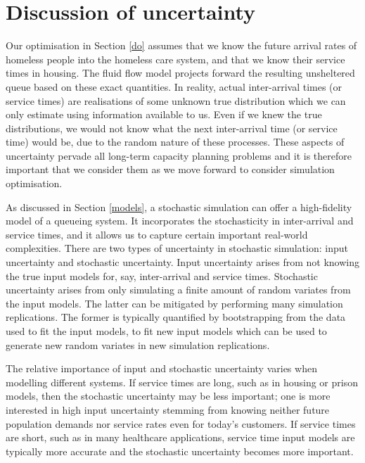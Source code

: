 \documentclass[12pt,a4paper]{article}
\begin{document}
\newpage

\section{Discussion of uncertainty} \label{uncert}

Our optimisation in Section \ref{do} assumes that we know the future arrival rates of homeless people into the homeless care system, and that we know their service times in housing. The fluid flow model projects forward the resulting unsheltered queue based on these exact quantities. In reality, actual inter-arrival times (or service times) are realisations of some unknown true distribution which we can only estimate using information available to us. Even if we knew the true distributions, we would not know what the next inter-arrival time (or service time) would be, due to the random nature of these processes. These aspects of uncertainty pervade all long-term capacity planning problems and it is therefore important that we consider them as we move forward to consider simulation optimisation.

As discussed in Section \ref{models}, a stochastic simulation can offer a high-fidelity model of a queueing system. It incorporates the stochasticity in inter-arrival and service times, and it allows us to capture certain important real-world complexities. There are two types of uncertainty in stochastic simulation: input uncertainty and stochastic uncertainty. Input uncertainty arises from not knowing the true input models for, say, inter-arrival and service times. Stochastic uncertainty arises from only simulating a finite amount of random variates from the input models. The latter can be mitigated by performing many simulation replications. The former is typically quantified by bootstrapping from the data used to fit the input models, to fit new input models which can be used to generate new random variates in new simulation replications.

The relative importance of input and stochastic uncertainty varies when modelling different systems. If service times are long, such as in housing or prison models, then the stochastic uncertainty may be less important; one is more interested in high input uncertainty stemming from knowing neither future population demands nor service rates even for today's customers. If service times are short, such as in many healthcare applications, service time input models are typically more accurate and the stochastic uncertainty becomes more important. 
\end{document}
